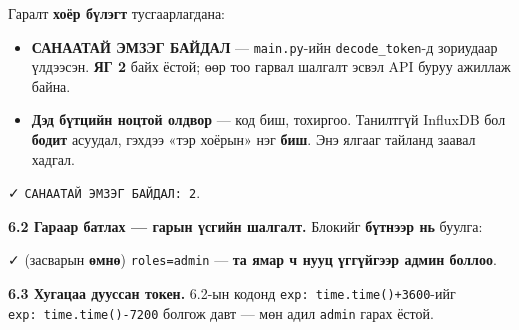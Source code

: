 Гаралт \textbf{хоёр бүлэгт} тусгаарлагдана:

\begin{itemize}
\tightlist
\item
  \textbf{САНААТАЙ ЭМЗЭГ БАЙДАЛ} --- \texttt{main.py}-ийн \texttt{decode\_token}-д зориудаар үлдээсэн. \textbf{ЯГ 2} байх ёстой; өөр тоо гарвал шалгалт эсвэл API буруу ажиллаж байна.
\item
  \textbf{Дэд бүтцийн ноцтой олдвор} --- код биш, тохиргоо. Танилтгүй InfluxDB бол \textbf{бодит} асуудал, гэхдээ «тэр хоёрын» нэг \textbf{биш}. Энэ ялгааг тайланд заавал хадгал.
\end{itemize}

✓ \texttt{САНААТАЙ\ ЭМЗЭГ\ БАЙДАЛ:\allowbreak{}\ 2}.

\textbf{6.2 Гараар батлах --- гарын үсгийн шалгалт.} Блокийг \textbf{бүтнээр нь} буулга:

\begin{Shaded}
\begin{Highlighting}[]
\NormalTok{ {-} }
\end{Highlighting}
\end{Shaded}

✓ (засварын \textbf{өмнө}) \texttt{roles=admin} --- \textbf{та ямар ч нууц үггүйгээр админ боллоо}.

\textbf{6.3 Хугацаа дууссан токен.} 6.2-ын кодонд \texttt{\textquotesingle{}exp\textquotesingle{}:\ time.time()+3600}-ийг \texttt{\textquotesingle{}exp\textquotesingle{}:\ time.time()-7200} болгож давт --- мөн адил \texttt{admin} гарах ёстой.

